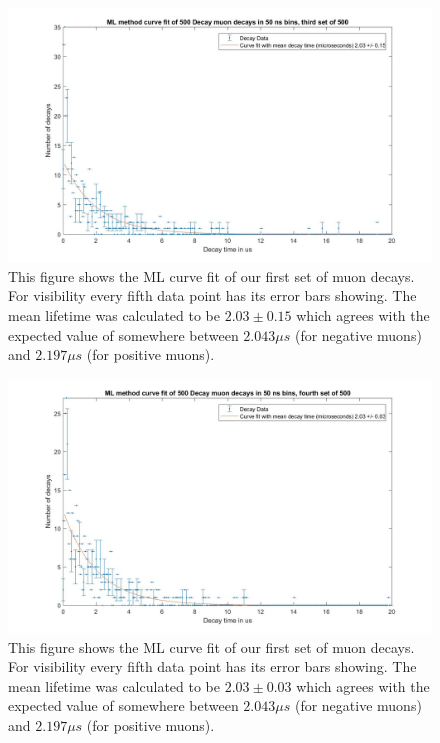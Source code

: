 \documentclass{article}
\begin{document}
\begin{figure}[H]
\includegraphics[scale=0.4,center]{ML_Curve_Fit_500c.jpg}
\caption{This figure shows the ML curve fit of our first set of muon decays.  For visibility every fifth data point has its error bars showing.  The mean lifetime was calculated to be $2.03 \pm 0.15$ which agrees with the expected value of somewhere between $2.043 \mu s$ (for negative muons) and $2.197 \mu s$ (for positive muons).}
\end{figure}

\begin{figure}[H]
\includegraphics[scale=0.4,center]{ML_Curve_Fit_500d.jpg}
\caption{This figure shows the ML curve fit of our first set of muon decays.  For visibility every fifth data point has its error bars showing.  The mean lifetime was calculated to be $2.03 \pm 0.03$ which agrees with the expected value of somewhere between $2.043 \mu s$ (for negative muons) and $2.197 \mu s$ (for positive muons).}
\end{figure}
\end{document}
